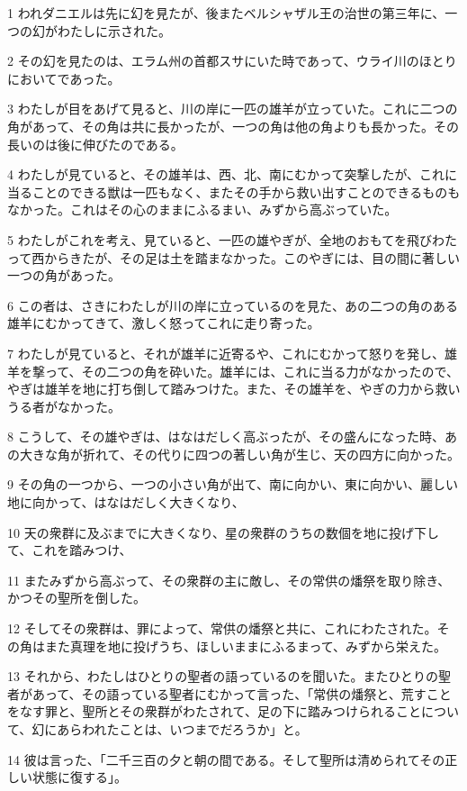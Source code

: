 \par 1 われダニエルは先に幻を見たが、後またベルシャザル王の治世の第三年に、一つの幻がわたしに示された。
\par 2 その幻を見たのは、エラム州の首都スサにいた時であって、ウライ川のほとりにおいてであった。
\par 3 わたしが目をあげて見ると、川の岸に一匹の雄羊が立っていた。これに二つの角があって、その角は共に長かったが、一つの角は他の角よりも長かった。その長いのは後に伸びたのである。
\par 4 わたしが見ていると、その雄羊は、西、北、南にむかって突撃したが、これに当ることのできる獣は一匹もなく、またその手から救い出すことのできるものもなかった。これはその心のままにふるまい、みずから高ぶっていた。
\par 5 わたしがこれを考え、見ていると、一匹の雄やぎが、全地のおもてを飛びわたって西からきたが、その足は土を踏まなかった。このやぎには、目の間に著しい一つの角があった。
\par 6 この者は、さきにわたしが川の岸に立っているのを見た、あの二つの角のある雄羊にむかってきて、激しく怒ってこれに走り寄った。
\par 7 わたしが見ていると、それが雄羊に近寄るや、これにむかって怒りを発し、雄羊を撃って、その二つの角を砕いた。雄羊には、これに当る力がなかったので、やぎは雄羊を地に打ち倒して踏みつけた。また、その雄羊を、やぎの力から救いうる者がなかった。
\par 8 こうして、その雄やぎは、はなはだしく高ぶったが、その盛んになった時、あの大きな角が折れて、その代りに四つの著しい角が生じ、天の四方に向かった。
\par 9 その角の一つから、一つの小さい角が出て、南に向かい、東に向かい、麗しい地に向かって、はなはだしく大きくなり、
\par 10 天の衆群に及ぶまでに大きくなり、星の衆群のうちの数個を地に投げ下して、これを踏みつけ、
\par 11 またみずから高ぶって、その衆群の主に敵し、その常供の燔祭を取り除き、かつその聖所を倒した。
\par 12 そしてその衆群は、罪によって、常供の燔祭と共に、これにわたされた。その角はまた真理を地に投げうち、ほしいままにふるまって、みずから栄えた。
\par 13 それから、わたしはひとりの聖者の語っているのを聞いた。またひとりの聖者があって、その語っている聖者にむかって言った、「常供の燔祭と、荒すことをなす罪と、聖所とその衆群がわたされて、足の下に踏みつけられることについて、幻にあらわれたことは、いつまでだろうか」と。
\par 14 彼は言った、「二千三百の夕と朝の間である。そして聖所は清められてその正しい状態に復する」。
